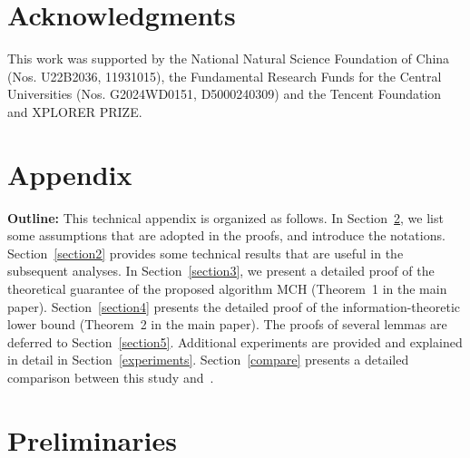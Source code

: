\documentclass{article}
\begin{document}
\section*{Acknowledgments}
This work was supported by the National Natural Science Foundation of China (Nos. U22B2036, 11931015), the Fundamental Research Funds for the Central Universities (Nos. G2024WD0151, D5000240309) and the Tencent Foundation and XPLORER PRIZE. 

\medskip




\appendix

\section{Appendix}

\textbf{Outline:} This technical appendix is organized as follows. In Section~\ref{section1}, we list some assumptions that are adopted in the proofs, and introduce the notations. Section~\ref{section2} provides some technical results that are useful in the subsequent analyses. In Section~\ref{section3}, we present a detailed proof of the theoretical guarantee of the proposed algorithm MCH (Theorem~1 in the main paper). Section~\ref{section4} presents the detailed proof of the information-theoretic lower bound (Theorem~2 in the main paper). The proofs of several lemmas are deferred to Section~\ref{section5}. Additional experiments are provided and explained in detail in Section~\ref{experiments}. Section~\ref{compare} presents a detailed comparison between this study and~\cite{ahn2018binary}.


\section{Preliminaries}\label{section1}
\
\end{document}

